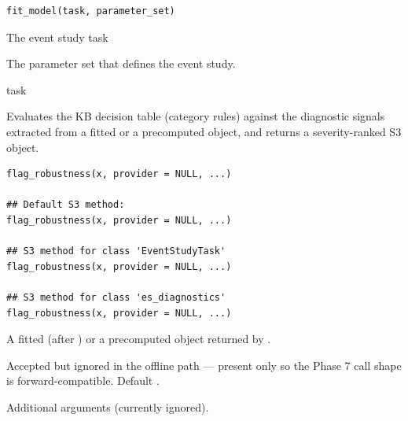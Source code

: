 \documentclass[a4paper]{book}
\begin{document}
%
\begin{Usage}
\begin{verbatim}
fit_model(task, parameter_set)
\end{verbatim}
\end{Usage}
%
\begin{Arguments}
\begin{ldescription}
\item[\code{task}] The event study task

\item[\code{parameter\_set}] The parameter set that defines the event study.
\end{ldescription}
\end{Arguments}
%
\begin{Value}
task
\end{Value}
%
\begin{Description}
Evaluates the KB decision table (category  rules) against
the diagnostic signals extracted from a fitted  or a
precomputed  object, and returns a severity-ranked
 S3 object.
\end{Description}
%
\begin{Usage}
\begin{verbatim}
flag_robustness(x, provider = NULL, ...)

## Default S3 method:
flag_robustness(x, provider = NULL, ...)

## S3 method for class 'EventStudyTask'
flag_robustness(x, provider = NULL, ...)

## S3 method for class 'es_diagnostics'
flag_robustness(x, provider = NULL, ...)
\end{verbatim}
\end{Usage}
%
\begin{Arguments}
\begin{ldescription}
\item[\code{x}] A fitted  (after ) or a
precomputed  object returned by .

\item[\code{provider}] Accepted but ignored in the offline path — present only so
the Phase 7 call shape is forward-compatible. Default .

\item[\code{...}] Additional arguments (currently ignored).
\end{ldescription}
\end{Arguments}
\end{document}
